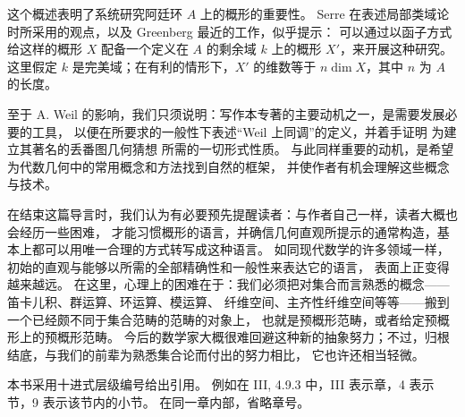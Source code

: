 这个概述表明了系统研究阿廷环 $A$ 上的概形的重要性。
Serre 在表述局部类域论时所采用的观点，以及 Greenberg 最近的工作，似乎提示：
可以通过以函子方式给这样的概形 $X$ 配备一个定义在 $A$ 的剩余域 $k$ 上的概形 $X'$，来开展这种研究。
这里假定 $k$ 是完美域；在有利的情形下，$X'$ 的维数等于 $n\dim X$，其中 $n$ 为 $A$ 的长度。

至于 A. Weil 的影响，我们只须说明：写作本专著的主要动机之一，是需要发展必要的工具，
以便在所要求的一般性下表述“Weil 上同调”的定义，并着手证明
为建立其著名的丢番图几何猜想\cite{b19} 所需的一切形式性质。
与此同样重要的动机，是希望为代数几何中的常用概念和方法找到自然的框架，
并使作者有机会理解这些概念与技术。

\separation

在结束这篇导言时，我们认为有必要预先提醒读者：与作者自己一样，读者大概也会经历一些困难，
才能习惯概形的语言，并确信几何直观所提示的通常构造，基本上都可以用唯一合理的方式转写成这种语言。
如同现代数学的许多领域一样，初始的直观与能够以所需的全部精确性和一般性来表达它的语言，
表面上正变得越来越远。
在这里，心理上的困难在于：我们必须把对集合而言熟悉的概念——笛卡儿积、群运算、环运算、模运算、
纤维空间、主齐性纤维空间等等——搬到一个已经颇不同于集合范畴的范畴的对象上，
也就是预概形范畴，或者给定预概形上的预概形范畴。
今后的数学家大概很难回避这种新的抽象努力；不过，归根结底，与我们的前辈为熟悉集合论而付出的努力相比，
它也许还相当轻微。

\separation

本书采用十进式层级编号给出引用。
例如在 III, 4.9.3 中，III 表示章，4 表示节，9 表示该节内的小节。
在同一章内部，省略章号。


